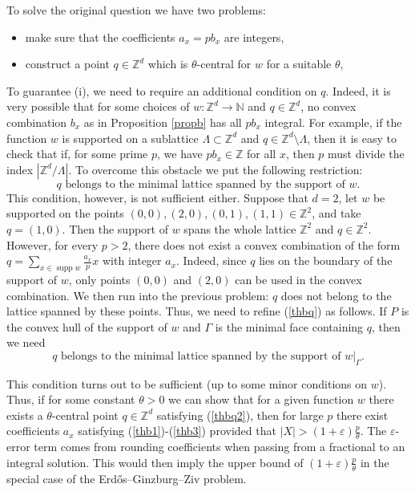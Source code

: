 \documentclass{daj}
\newcommand{\Z}{\mathbb Z}
\newcommand{\N}{\mathbb N}
\theoremstyle{definition}
\theoremstyle{remark}
\theoremstyle{definition}
\theoremstyle{definition}
\begin{document}
To solve the original question we have two problems:
\begin{itemize}
    \item[(i)] make sure that the coefficients $a_x = p b_x$ are integers,
    \item[(ii)] construct a point $q \in \Z^d$ which is $\theta$-central for $w$ for a suitable $\theta$,
\end{itemize}

To guarantee (i), we need to require an additional condition on $q$. Indeed, it is very possible that for some choices of $w: \Z^d \rightarrow \N$ and $q \in \Z^d$, no convex combination $b_x$ as in Proposition \ref{propb} has all $p b_x$ integral. For example, if the function $w$ is supported on a sublattice $\Lambda \subset \Z^d$ and $q \in \Z^d \setminus \Lambda$, then it is easy to check that if, for some prime $p$, we have $p b_x \in \Z$ for all $x$, then $p$ must divide the index $|\Z^d / \Lambda|$. 
To overcome this obstacle we put the following restriction:
\begin{equation}\label{thbq}
    q\text{ belongs to the minimal lattice spanned by the support of }w.
\end{equation}
This condition, however, is not sufficient either. Suppose that $d=2$, let $w$ be supported on the points $(0, 0), (2, 0), (0, 1), (1, 1) \in \Z^2$, and take $q = (1, 0)$. Then the support of $w$ spans the whole lattice $\Z^2$ and $q \in \Z^2$. However, for every $p>2$, there does not exist a convex combination of the form $q = \sum_{x \in \operatorname{supp} w} \frac{a_x}{p}x$ with integer $a_x$. Indeed, since $q$ lies on the boundary of the support of $w$, only points $(0, 0)$ and $(2, 0)$ can be used in the convex combination. We then run into the previous problem: $q$ does not belong to the lattice spanned by these points. Thus, we need to refine (\ref{thbq}) as follows. If $P$ is the convex hull of the support of $w$ and $\Gamma$ is the minimal face containing $q$, then we need
\begin{equation}\label{thbq2}
    q\text{ belongs to the minimal lattice spanned by the support of }w|_\Gamma.
\end{equation}

This condition turns out to be sufficient (up to some minor conditions on $w$).
Thus, if for some constant $\theta >0$ we can show that for a given function $w$ there exists a $\theta$-central point $q \in \Z^d$ satisfying (\ref{thbq2}), then for large $p$ there exist coefficients $a_x$ satisfying (\ref{thb1})-(\ref{thb3}) provided that $|X| > (1+\varepsilon)\frac{p}{\theta}$. The $\varepsilon$-error term comes from rounding coefficients when passing from a fractional to an integral solution. This would then imply the upper bound of $(1+\varepsilon) \frac{p}{\theta}$ in the special case of the Erd{\H o}s--Ginzburg--Ziv problem.
\end{document}
